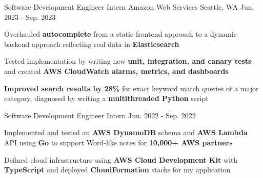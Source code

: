 \begin{cventries}
  \cvtwoentry
    {Software Development Engineer Intern} %
    {Amazon Web Services} %
    {Seattle, WA} %
    {Jun. 2023 - Sep. 2023}
    {
      \begin{cvitems}
        \item {Overhauled \textbf{autocomplete} from a static frontend approach to a dynamic backend approach reflecting real data in \textbf{Elasticsearch}}
        \item {Tested implementation by writing new \textbf{unit, integration, and canary tests} and created \textbf{AWS CloudWatch alarms, metrics, and dashboards}}
        \item {\textbf{Improved search results by 28\%} for exact keyword match queries of a major category, diagnosed by writing a \textbf{multithreaded Python} script}
      \end{cvitems}
    }
    {Software Development Engineer Intern}
    {Jun. 2022 - Sep. 2022} %
    {
      \begin{cvitems} %
        \item {Implemented and tested an \textbf{AWS DynamoDB} schema and \textbf{AWS Lambda} API using \textbf{Go} to support Word-like notes for \textbf{10,000+ AWS partners} }
        \item {Defined cloud infrastructure using \textbf{AWS Cloud Development Kit} with \textbf{TypeScript} and deployed \textbf{CloudFormation} stacks for my application}
      \end{cvitems}
    }


\end{cventries}
